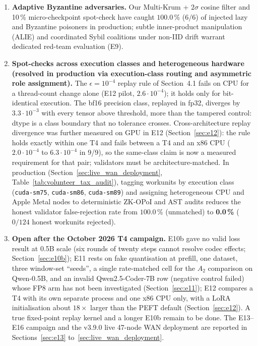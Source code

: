 \documentclass[11pt,a4paper]{article}
\begin{document}
\begin{enumerate}[leftmargin=1.8em]
    \item \textbf{Adaptive Byzantine adversaries.} Our Multi-Krum + $2\sigma$ cosine filter and 10\,\% micro-checkpoint spot-check have caught $100.0\,\%$ ($6/6$) of injected lazy and Byzantine poisoners in production; subtle inner-product manipulation (ALIE) and coordinated Sybil coalitions under non-IID drift warrant dedicated red-team evaluation (E9).
    \item \textbf{Spot-checks across execution classes and heterogeneous hardware (resolved in production via execution-class routing and asymmetric role assignment).} The $\epsilon = 10^{-4}$ replay rule of Section~4.1 fails on CPU for a thread-count change alone (E12 pilot, $2.6\cdot 10^{-4}$); it holds only for bit-identical execution. The bf16 precision class, replayed in fp32, diverges by $3.3\cdot 10^{-3}$ with every tensor above threshold, more than the tampered control: dtype is a class boundary that no tolerance crosses. Cross-architecture replay divergence was further measured on GPU in E12 (Section~\ref{sec:e12}): the rule holds exactly within one T4 and fails between a T4 and an x86 CPU ($2.0\cdot10^{-4}$ to $6.3\cdot10^{-4}$ in 9/9), so the same-class claim is now a measured requirement for that pair; validators must be architecture-matched. In production (Section~\ref{sec:live_wan_deployment}, Table~\ref{tab:volunteer_tax_audit}), tagging workunits by execution class (\texttt{cuda-sm75}, \texttt{cuda-sm86}, \texttt{cuda-sm89}) and assigning heterogeneous CPU and Apple Metal nodes to deterministic ZK-OPoI and AST audits reduces the honest validator false-rejection rate from $100.0\,\%$ (unmatched) to \textbf{0.0\,\%} ($0/124$ honest workunits rejected).
    \item \textbf{Open after the October 2026 T4 campaign.} E10b gave no valid loss result at 0.5B scale (six rounds of twenty steps cannot resolve codec effects; Section~\ref{sec:e10b}); E11 rests on fake quantisation at prefill, one dataset, three window-set ``seeds'', a single rate-matched cell for the $A_2$ comparison on Qwen-0.5B, and an invalid Qwen2.5-Coder-7B row (negative control failed) whose FP8 arm has not been investigated (Section~\ref{sec:e11}); E12 compares a T4 with its own separate process and one x86 CPU only, with a LoRA initialisation about $18\times$ larger than the PEFT default (Section~\ref{sec:e12}). A true fixed-point replay kernel and a longer E10b remain to be done. The E13--E16 campaign and the v3.9.0 live 47-node WAN deployment are reported in Sections~\ref{sec:e13} to~\ref{sec:live_wan_deployment}.

\end{enumerate}
\end{document}
